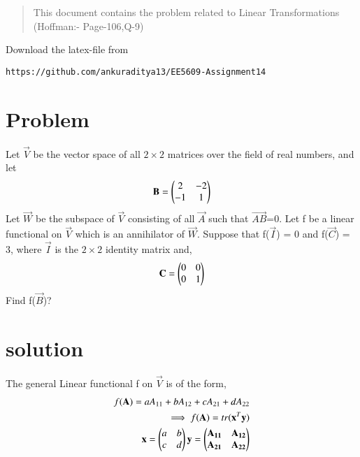 \documentclass[journal,12pt,twocolumn]{IEEEtran}
\begin{document}
\begin{abstract}
This document contains the problem related to Linear Transformations (Hoffman:- Page-106,Q-9) 
\end{abstract}
Download the latex-file from 
\begin{lstlisting}
https://github.com/ankuraditya13/EE5609-Assignment14
\end{lstlisting}

\section{Problem}
Let $\vec{V}$ be the vector space of all $2\times 2$ matrices over the field of real numbers, and let
\begin{align}
\mathbf{B}= \begin{pmatrix}2&-2\\-1&1\end{pmatrix}
\end{align}  
Let $\vec{W}$ be the subspace of $\vec{V}$ consisting of all $\vec{A}$ such that $\vec{AB}$=0. Let f be a linear functional on $\vec{V}$ which is an annihilator of $\vec{W}$. Suppose that f($\vec{I}$) = 0 and f($\vec{C}$) = 3, where $\vec{I}$ is the $2\times 2$ identity matrix and,
\begin{align}
\mathbf{C} = \begin{pmatrix}0&0\\0&1\end{pmatrix}
\end{align} 
Find f($\vec{B}$)?
\section{solution}
The general Linear functional f on $\vec{V}$ is of the form,
\begin{align}
f(\mathbf{A}) = aA_{11}+bA_{12}+cA_{21}+dA_{22}\label{1}\\
\implies f(\mathbf{A}) = tr(\mathbf{x}^T\mathbf{y})\\
\mathbf{x} = \begin{pmatrix}a&b\\c&d\end{pmatrix}
\mathbf{y} = \begin{pmatrix}\mathbf{A_{11}}&\mathbf{A_{12}}\\\mathbf{A_{21}}&\mathbf{A_{22}}\end{pmatrix} \label{1.5}
\end{align}
\end{document}
